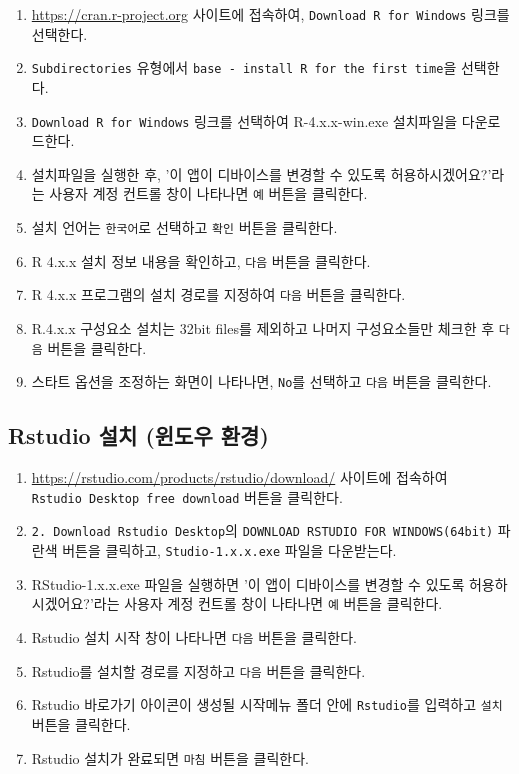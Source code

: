 \documentclass[
  11pt,
  krantz2, a4paper, twoside]{krantz}
\providecommand{\tightlist}{%
  \setlength{\itemsep}{0pt}\setlength{\parskip}{0pt}}
\theoremstyle{definition}
\theoremstyle{definition}
\theoremstyle{definition}
\theoremstyle{definition}
\theoremstyle{remark}
\begin{document}
\begin{enumerate}
\def\labelenumi{\arabic{enumi}.}
\tightlist
\item
  \url{https://cran.r-project.org} 사이트에 접속하여, \texttt{Download\ R\ for\ Windows} 링크를 선택한다.
\item
  \texttt{Subdirectories} 유형에서 \texttt{base\ -\ install\ R\ for\ the\ first\ time}을 선택한다.
\item
  \texttt{Download\ R\ for\ Windows} 링크를 선택하여 R-4.x.x-win.exe 설치파일을 다운로드한다.
\item
  설치파일을 실행한 후, '이 앱이 디바이스를 변경할 수 있도록 허용하시겠어요?'라는 사용자 계정 컨트롤 창이 나타나면 \texttt{예} 버튼을 클릭한다.
\item
  설치 언어는 \texttt{한국어}로 선택하고 \texttt{확인} 버튼을 클릭한다.
\item
  R 4.x.x 설치 정보 내용을 확인하고, \texttt{다음} 버튼을 클릭한다.
\item
  R 4.x.x 프로그램의 설치 경로를 지정하여 \texttt{다음} 버튼을 클릭한다.
\item
  R.4.x.x 구성요소 설치는 32bit files를 제외하고 나머지 구성요소들만 체크한 후 \texttt{다음} 버튼을 클릭한다.
\item
  스타트 옵션을 조정하는 화면이 나타나면, \texttt{No}를 선택하고 \texttt{다음} 버튼을 클릭한다.
\end{enumerate}

\subsection{Rstudio 설치 (윈도우 환경)}\label{rstudio-uxc124uxce58-uxc708uxb3c4uxc6b0-uxd658uxacbd}

\begin{enumerate}
\def\labelenumi{\arabic{enumi}.}
\tightlist
\item
  \url{https://rstudio.com/products/rstudio/download/} 사이트에 접속하여 \texttt{Rstudio\ Desktop\ free\ download} 버튼을 클릭한다.
\item
  \texttt{2.\ Download\ Rstudio\ Desktop}의 \texttt{DOWNLOAD\ RSTUDIO\ FOR\ WINDOWS(64bit)} 파란색 버튼을 클릭하고, \texttt{Studio-1.x.x.exe} 파일을 다운받는다.
\item
  RStudio-1.x.x.exe 파일을 실행하면 '이 앱이 디바이스를 변경할 수 있도록 허용하시겠어요?'라는 사용자 계정 컨트롤 창이 나타나면 \texttt{예} 버튼을 클릭한다.
\item
  Rstudio 설치 시작 창이 나타나면 \texttt{다음} 버튼을 클릭한다.
\item
  Rstudio를 설치할 경로를 지정하고 \texttt{다음} 버튼을 클릭한다.
\item
  Rstudio 바로가기 아이콘이 생성될 시작메뉴 폴더 안에 \texttt{Rstudio}를 입력하고 \texttt{설치} 버튼을 클릭한다.
\item
  Rstudio 설치가 완료되면 \texttt{마침} 버튼을 클릭한다.
\end{enumerate}
\end{document}
